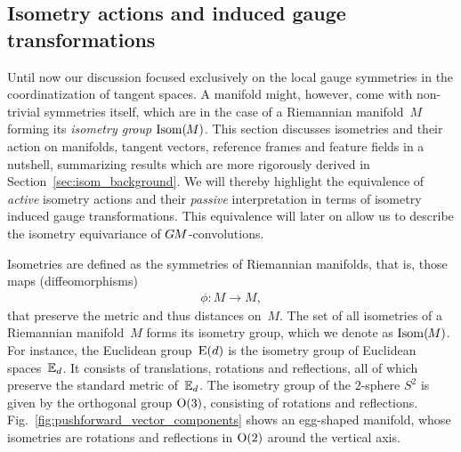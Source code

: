 

\subsection{Isometry actions and induced gauge transformations}
\label{sec:isometries_local}


Until now our discussion focused exclusively on the local gauge symmetries in the coordinatization of tangent spaces.
A manifold might, however, come with non-trivial symmetries itself, which are in the case of a Riemannian manifold~$M$ forming its \emph{isometry group} $\operatorname{Isom}(\mkern-1.5mu M \mkern-.5mu)$.
This section discusses isometries and their action on manifolds, tangent vectors, reference frames and feature fields in a nutshell, summarizing results which are more rigorously derived in Section~\ref{sec:isom_background}.
We will thereby highlight the equivalence of \emph{active} isometry actions and their \emph{passive} interpretation in terms of isometry induced gauge transformations.
This equivalence will later on allow us to describe the isometry equivariance of $G\mkern-1.4muM$-convolutions.


Isometries are defined as the symmetries of Riemannian manifolds, that is, those maps (diffeomorphisms)
\begin{align}
    \phi: M \to M,
\end{align}
that preserve the metric and thus distances on~$M$.
The set of all isometries of a Riemannian manifold~$M$ forms its isometry group, which we denote as $\operatorname{Isom}(\mkern-1.5mu M \mkern-.5mu)$.
For instance, the Euclidean group~$\operatorname{E}(d)$ is the isometry group of Euclidean spaces~$\mathbb{E}_d$.
It consists of translations, rotations and reflections, all of which preserve the standard metric of~$\mathbb{E}_d$.
The isometry group of the $2$-sphere $S^2$ is given by the orthogonal group $\operatorname{O}(3)$, consisting of rotations and reflections.
Fig.~\ref{fig:pushforward_vector_components} shows an egg-shaped manifold, whose isometries are rotations and reflections in $\operatorname{O}(2)$ around the vertical axis.


